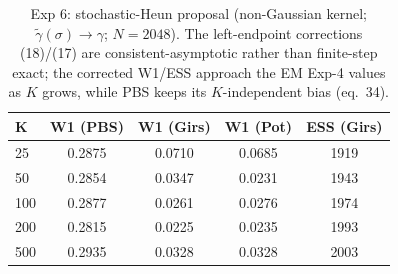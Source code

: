 \begin{table}[ht]
\centering
\caption{Exp 6: stochastic-Heun proposal (non-Gaussian kernel; $\tilde\gamma(\sigma)\to\gamma$; $N=2048$). The left-endpoint corrections (18)/(17) are consistent-asymptotic rather than finite-step exact; the corrected W1/ESS approach the EM Exp-4 values as $K$ grows, while PBS keeps its $K$-independent bias (eq.~34).}
\label{tab:toy_6}
\begin{tabular}{lcccc}
\toprule
K & W1 (PBS) & W1 (Girs) & W1 (Pot) & ESS (Girs) \\
\midrule
25 & 0.2875 & 0.0710 & 0.0685 & 1919 \\
50 & 0.2854 & 0.0347 & 0.0231 & 1943 \\
100 & 0.2877 & 0.0261 & 0.0276 & 1974 \\
200 & 0.2815 & 0.0225 & 0.0235 & 1993 \\
500 & 0.2935 & 0.0328 & 0.0328 & 2003 \\
\bottomrule
\end{tabular}
\end{table}
